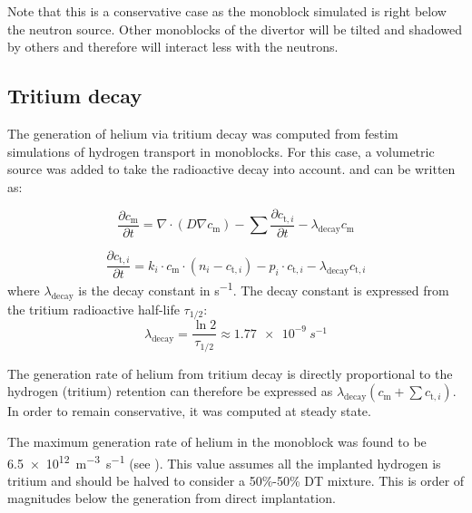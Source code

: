 Note that this is a conservative case as the \gls{monoblock} simulated is right below the neutron source.
Other \glspl{monoblock} of the \gls{divertor} will be tilted and shadowed by others and therefore will interact less with the neutrons.


\subsection{Tritium decay}

The generation of helium via tritium decay was computed from \gls{festim} simulations of hydrogen transport in \glspl{monoblock}.
For this case, a volumetric source was added to take the radioactive decay into account.
 and  can be written as:

\begin{equation}
    \frac{\partial c_\mathrm{m}}{\partial t}=\nabla \cdot (D \nabla c_\mathrm{m} ) -\sum \frac{\partial c_{\mathrm{t}, i}}{\partial t} - \lambda_\mathrm{decay} c_\mathrm{m}
\end{equation}

\begin{equation}
    \frac{\partial c_{\mathrm{t}, i}}{\partial t}=k_i \cdot c_\mathrm{m} \cdot\left(n_{i}-c_{\mathrm{t}, i}\right)-p_i \cdot c_{\mathrm{t}, i} - \lambda_\mathrm{decay} c_{\mathrm{t}, i}
\end{equation}
where $\lambda_\mathrm{decay}$ is the decay constant in \si{s^{-1}}.
The decay constant is expressed from the tritium radioactive half-life $\tau_{1/2}$:
\begin{equation}
    \lambda_\mathrm{decay} = \frac{\ln 2}{\tau_{1/2}} \approx \SI{1.77e-9}{s^{-1}}
\end{equation}

The generation rate of helium from tritium decay is directly proportional to the hydrogen (tritium) retention can therefore be expressed as $\lambda_\mathrm{decay} (c_\mathrm{m} + \sum c_{\mathrm{t}, i})$.
In order to remain conservative, it was computed at steady state.

The maximum generation rate of helium in the \gls{monoblock} was found to be \SI{6.5e12}{m^{-3}.s^{-1}} (see ).
This value assumes all the implanted hydrogen is tritium and should be halved to consider a 50\%-50\% DT mixture.
This is order of magnitudes below the generation from direct implantation.

